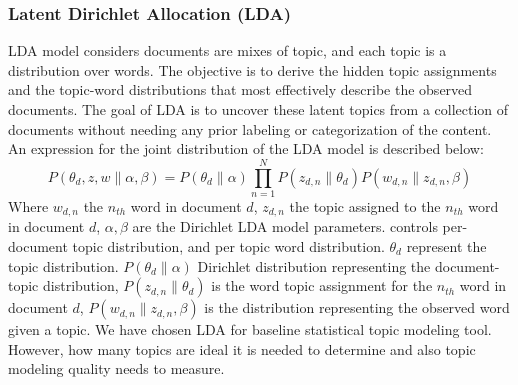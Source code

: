 \documentclass[sn-mathphys,Numbered]{sn-jnl}%
\theoremstyle{thmstyleone}%
\theoremstyle{thmstyletwo}%
\theoremstyle{thmstylethree}%
\begin{document}
\subsubsection{Latent Dirichlet Allocation (LDA)}
\label{lda_mdel}
LDA model \cite{jelodar_latent_2019, gupta_pan_lda_2021, pichardo_lagunas_svd_lda_2015, selvi_classification_2019} considers documents are mixes of topic, and each topic is a distribution over words. The objective is to derive the hidden topic assignments and the topic-word distributions that most effectively describe the observed documents. The goal of LDA is to uncover these latent topics from a collection of documents without needing any prior labeling or categorization of the content. An expression for the joint distribution of the LDA model is described below:  
\begin{equation}
P(\theta_d,z,w\|\alpha,\beta)=P(\theta_d\|\alpha)\prod^N_{n=1}P(z_{d,n}\|\theta_d)P(w_{d,n}\|z_{d,n},\beta)
\end{equation}
Where $w_{d,n}$ the $n_{th}$ word in document $d$, $z_{d,n}$ the topic assigned to the $n_{th}$ word in document $d$, $\alpha,\beta$ are the Dirichlet LDA model parameters. controls per-document topic distribution, and per topic word distribution. $\theta_d$ represent the topic distribution. $P(\theta_d \| \alpha)$ Dirichlet 
distribution representing the document-topic distribution, $P(z_{d,n}\|\theta_d)$ is the word topic assignment for the $n_{th}$ word in document $d$, $P(w_{d,n}\|z_{d,n},\beta)$ is the distribution representing the observed word given a topic. We have chosen LDA for baseline statistical topic modeling tool. However, how many topics are ideal it is needed to determine and also topic modeling quality needs to measure.
\end{document}
